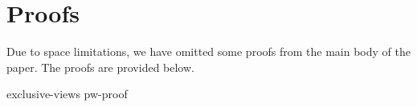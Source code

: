 \section{Proofs}
\label{app:proofs}

Due to space limitations, we have omitted some proofs from
the main body of the paper.  The proofs are provided below.

{exclusive-views}
{pw-proof}

